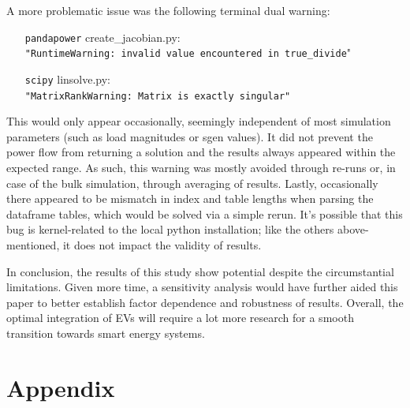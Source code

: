 \documentclass[a4paper,10pt]{report}
\begin{document}
A more problematic issue was the following terminal dual warning:
\noindent
\begin{itemize}[leftmargin=2.1cm]
	\item[\texttt{pandapower}] create\_jacobian.py:\\
	\texttt{"RuntimeWarning: invalid value encountered in true\_divide}"
	\item[\texttt{scipy}] linsolve.py:\\
	\texttt{"MatrixRankWarning: Matrix is exactly singular"}
\end{itemize}
This would only appear occasionally, seemingly independent of most simulation parameters (such as load magnitudes or sgen values). It did not prevent the power flow from returning a solution and the results always appeared within the expected range. As such, this warning was mostly avoided through re-runs or, in case of the bulk simulation, through averaging of results. Lastly, occasionally there appeared to be mismatch in index and table lengths when parsing the dataframe tables, which would be solved via a simple rerun. It's possible that this bug is kernel-related to the local python installation; like the others above-mentioned, it does not impact the validity of results.

In conclusion, the results of this study show potential despite the circumstantial limitations. Given more time, a sensitivity analysis would have further aided this paper to better establish factor dependence and robustness of results. Overall, the optimal integration of EVs will require a lot more research for a smooth transition towards smart energy systems.



\chapter*{Appendix}\label{chapter_appendix}


\end{document}
